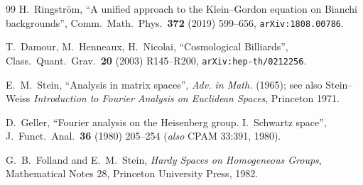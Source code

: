 \documentclass[11pt,a4paper]{article}
\theoremstyle{definition}
\begin{document}
\begin{thebibliography}{99}
 H.\ Ringstr\"om, ``A unified approach to the
Klein--Gordon equation on Bianchi backgrounds'',
Comm.\ Math.\ Phys.\ \textbf{372} (2019) 599--656,
\texttt{arXiv:1808.00786}.

 T.\ Damour, M.\ Henneaux, H.\ Nicolai, ``Cosmological
Billiards'', Class.\ Quant.\ Grav.\ \textbf{20} (2003) R145--R200,
\texttt{arXiv:hep-th/0212256}.

 E.~M.\ Stein, ``Analysis in matrix spaces'', \emph{Adv. in Math.}
(1965); see also Stein--Weiss \emph{Introduction to Fourier Analysis on
Euclidean Spaces}, Princeton 1971.

 D.\ Geller, ``Fourier analysis on the Heisenberg group.
I.\ Schwartz space'', J.\ Funct.\ Anal.\ \textbf{36} (1980) 205--254
(\emph{also} CPAM 33:391, 1980).

 G.~B.\ Folland and E.~M.\ Stein, \emph{Hardy Spaces on
Homogeneous Groups}, Mathematical Notes 28, Princeton University Press, 1982.

\end{thebibliography}
\end{document}
